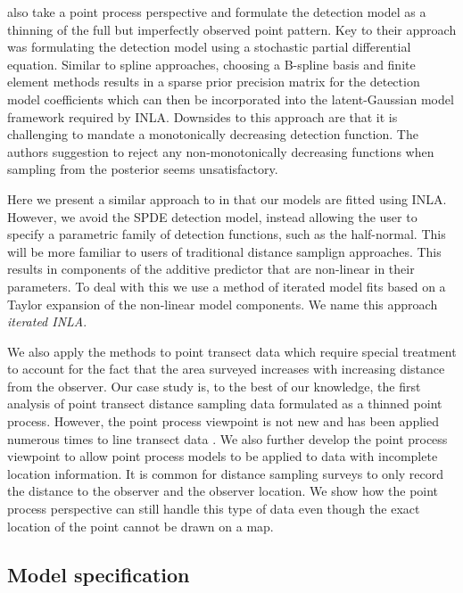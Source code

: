 \documentclass[preprint,12pt]{elsarticle}
\begin{document}
\citet{yuan_point_2017} also take a point process perspective and formulate the detection model as a thinning of the full but imperfectly observed point pattern.  Key to their approach was formulating the detection model using a stochastic partial differential equation.  Similar to spline approaches, choosing a B-spline basis and finite element methods results in a sparse prior precision matrix for the detection model coefficients which can then be incorporated into the latent-Gaussian model framework required by INLA.  Downsides to this approach are that it is challenging to mandate a monotonically decreasing detection function.  The authors suggestion to reject any non-monotonically decreasing functions when sampling from the posterior seems unsatisfactory.    

Here we present a similar approach to \citet{yuan_point_2017} in that our models are fitted using INLA.  However, we avoid the SPDE detection model, instead allowing the user to specify a parametric family of detection functions, such as the half-normal.  This will be more familiar to users of traditional distance samplign approaches.  This results in components of the additive predictor that are non-linear in their parameters.  To deal with this we use a method of iterated model fits based on a Taylor expansion of the non-linear model components.  We name this approach \textit{iterated INLA}.  

We also apply the methods to point transect data which require special treatment to account for the fact that the area surveyed increases with increasing distance from the observer.  Our case study is, to the best of our knowledge, the first analysis of point transect distance sampling data formulated as a thinned point process.  However, the point process viewpoint is not new and has been applied numerous times to line transect data \citep{buckland_model-based_2016, johnson_model-based_2010, hedley_spatial_2004,  hogmander_random_1991, stoyan_remark_1982}.  We also further develop the point process viewpoint to allow point process models to be applied to data with incomplete location information.  It is common for distance sampling surveys to only record the distance to the observer and the observer location.  We show how the point process perspective can still handle this type of data even though the exact location of the point cannot be drawn on a map.


\subsection{Model specification}
\end{document}
